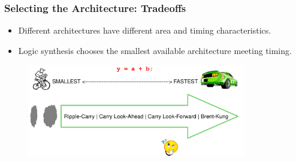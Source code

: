 \documentclass[t, notes, xcolor=table]{beamer}
\begin{document}
\begin{frame}
\frametitle{Selecting the Architecture: Tradeoffs}
\footnotesize{
\begin{itemize}
\item Different architectures have different area and timing characteristics.
\item Logic synthesis chooses the smallest available architecture meeting timing.
\end{itemize}
}
\begin{figure}
    \includegraphics[width=0.85\textwidth]{img/17_tradeoffs.png}
\end{figure}
\end{frame}
\end{document}
